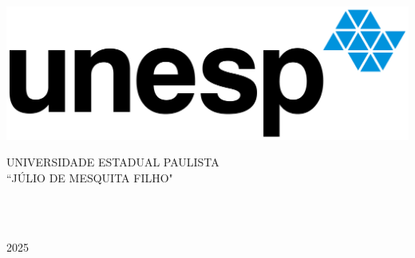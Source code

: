 
\thispagestyle{empty}

\begin{minipage}[c]{0.3\textwidth}
\includegraphics[width=\textwidth]{images/unesp.png}
\end{minipage}
\hspace{10pt}
\begin{minipage}[c]{0.6\textwidth}
\uppercase{Universidade Estadual Paulista \\``Júlio de Mesquita Filho"}
\end{minipage}

\vspace{1.5cm}

\begin{center}
    \julio\\
    \vspace{0.5cm}
    \audrey
\end{center}

\vspace{5cm}

\begin{center}
    \tituloH
\end{center}

\vspace*{\fill}

\begin{center}
    \uppercase{\cidade\\2025}
\end{center}